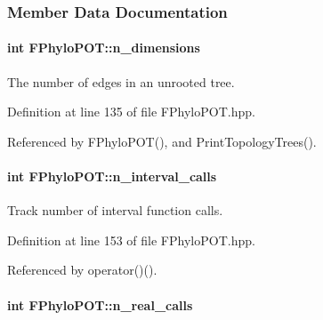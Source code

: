 \subsubsection{\-Member \-Data \-Documentation}
\hypertarget{classFPhyloPOT_aef4d908d355efec47e284d3845d74b73}{
\paragraph[{n\-\_\-dimensions}]{\setlength{\rightskip}{0pt plus 5cm}int {\bf \-F\-Phylo\-P\-O\-T\-::n\-\_\-dimensions}}}\label{classFPhyloPOT_aef4d908d355efec47e284d3845d74b73}


\-The number of edges in an unrooted tree. 



\-Definition at line 135 of file \-F\-Phylo\-P\-O\-T.\-hpp.



\-Referenced by \-F\-Phylo\-P\-O\-T(), and \-Print\-Topology\-Trees().

\hypertarget{classFPhyloPOT_a6121e3100ec3c00f522f15e1feae0070}{
\paragraph[{n\-\_\-interval\-\_\-calls}]{\setlength{\rightskip}{0pt plus 5cm}int {\bf \-F\-Phylo\-P\-O\-T\-::n\-\_\-interval\-\_\-calls}}}\label{classFPhyloPOT_a6121e3100ec3c00f522f15e1feae0070}


\-Track number of interval function calls. 



\-Definition at line 153 of file \-F\-Phylo\-P\-O\-T.\-hpp.



\-Referenced by operator()().

\hypertarget{classFPhyloPOT_a4e705aece25b8ee32d67aa6ab50cd9ec}{
\paragraph[{n\-\_\-real\-\_\-calls}]{\setlength{\rightskip}{0pt plus 5cm}int {\bf \-F\-Phylo\-P\-O\-T\-::n\-\_\-real\-\_\-calls}}}\label{classFPhyloPOT_a4e705aece25b8ee32d67aa6ab50cd9ec}


